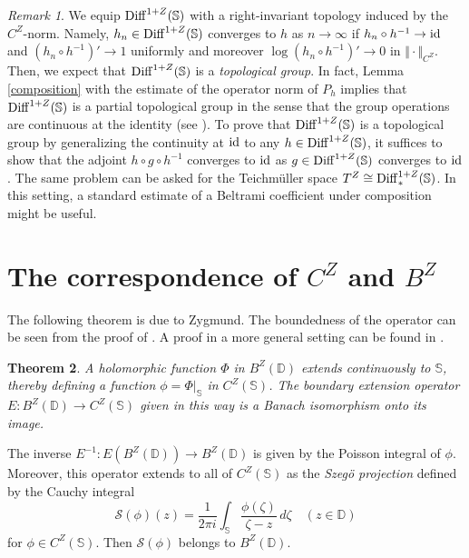 \documentclass[amstex]{amsart}
\newtheorem{theorem}{Theorem}[section]
\theoremstyle{definition}
\theoremstyle{remark}
\newtheorem{remark}[theorem]{Remark}
\numberwithin{equation}{section}
\begin{document}
\begin{remark}
We equip ${\rm Diff}^{1+Z}(\mathbb S)$ with a right-invariant topology induced by the $C^Z$-norm. 
Namely, $h_n \in {\rm Diff}^{1+Z}(\mathbb S)$
converges to $h$ as $n \to \infty$ if $h_n \circ h^{-1} \to \rm id$ and $(h_n \circ h^{-1})' \to 1$ uniformly and moreover
$\log (h_n \circ h^{-1})' \to 0$ in $\Vert \cdot \Vert_{C^Z}$. Then, we expect that ${\rm Diff}^{1+Z}(\mathbb S)$ is
a {\it topological group}. In fact, Lemma \ref{composition} with the estimate of the operator norm of $P_h$ implies that 
${\rm Diff}^{1+Z}(\mathbb S)$ is a partial topological group in the sense that the group operations are continuous at
the identity (see \cite[Definition 1.2]{GS}).
To prove that ${\rm Diff}^{1+Z}(\mathbb S)$ is a topological group by
generalizing the continuity at $\rm id$ to any $h \in {\rm Diff}^{1+Z}(\mathbb S)$, it suffices to show that
the adjoint
$h \circ g \circ h^{-1}$ converges to $\rm id$ as $g  \in {\rm Diff}^{1+Z}(\mathbb S)$ converges to $\rm id$.
The same problem can be asked for the Teichm\"uller space $T^Z \cong  {\rm Diff}^{1+Z}_*(\mathbb S)$.
In this setting, a standard estimate of a Beltrami coefficient under composition might be useful.
\end{remark}




\section{The correspondence of $C^Z$ and $B^Z$}\label{4}

The following theorem is due to Zygmund. The boundedness of the operator can be
seen from the proof of \cite[Theorem 5.3]{Du}. A proof in a more general setting can be found in \cite[V. Proposition 8]{St}.

\begin{theorem}\label{zygmund}
A holomorphic function $\Phi$ in $B^Z(\mathbb D)$ extends continuously to $\mathbb S$, thereby defining a function 
$\phi=\Phi|_{\mathbb S}$ in $C^Z(\mathbb S)$.
The boundary extension operator $E:B^Z(\mathbb D) \to C^Z(\mathbb S)$ given in this way is
a Banach isomorphism onto its image.
\end{theorem}

The inverse $E^{-1}:E(B^Z(\mathbb D)) \to B^Z(\mathbb D)$ is given by the Poisson integral of $\phi$.
Moreover, this operator extends to all of $C^Z(\mathbb S)$ as the {\it Szeg\"o projection} defined by the Cauchy integral
$$
{\mathcal S}(\phi)(z)=\frac{1}{2\pi i} \int_{\mathbb S} \frac{\phi(\zeta)}{\zeta-z}\,d \zeta \quad (z \in \mathbb D)
$$
for $\phi \in C^Z(\mathbb S)$.
Then ${\mathcal S}(\phi)$ belongs to $B^Z(\mathbb D)$. 
\end{document}
